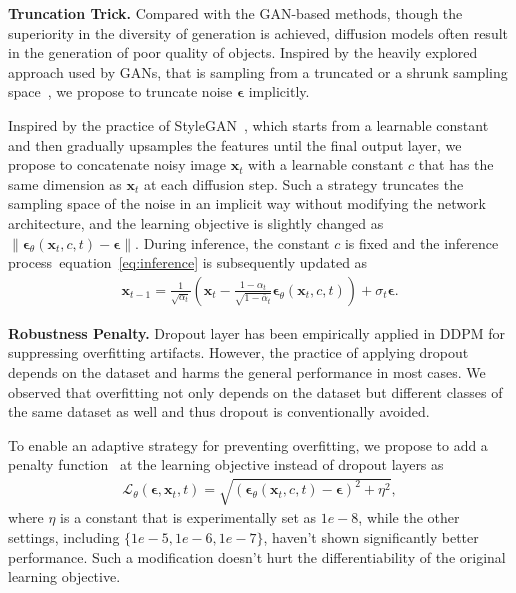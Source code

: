\documentclass[letterpaper]{article}
\def\eqref#1{equation~\ref{#1}}
\newcommand{\bx}{\mathbf{x}}
\newcommand{\bepsilon}{{\boldsymbol{\epsilon}}}
\begin{document}
\noindent \textbf{Truncation Trick.}
Compared with the GAN-based methods, though the superiority in the diversity of generation is achieved, diffusion models often result in the generation of poor quality of objects.  
Inspired by the heavily explored approach used by GANs, that is sampling from a truncated or a shrunk sampling space~\cite{brock2018large, kingma2018glow, karras2019style}, we propose to truncate noise $\bepsilon$ implicitly.

Inspired by the practice of StyleGAN~\cite{karras2019style}, which starts from a learnable constant and then gradually upsamples the features until the final output layer, we propose to concatenate noisy image $\bx_t$ with a learnable constant $c$ that has the same dimension as $\bx_t$ at each diffusion step.
Such a strategy truncates the sampling space of the noise in an implicit way without modifying the network architecture, and the learning objective is slightly changed as $\|\bepsilon_\theta(\bx_t, c, t) - \bepsilon\|$.
During inference, the constant $c$ is fixed and the inference process~\eqref{eq:inference} is subsequently updated as
\begin{align}
  \bx_{t-1} = \frac{1}{\sqrt{\alpha_t}}\left(\bx_t - \frac{1-\alpha_t}{\sqrt{1-\bar\alpha_t}}\bepsilon_\theta(\bx_t, c, t)\right) + \sigma_t\bepsilon.
\end{align}

\noindent \textbf{Robustness Penalty.}\label{sec:rob}
Dropout layer has been empirically applied in DDPM  for suppressing overfitting artifacts.
However, the practice of applying dropout depends on the dataset  and harms the general performance in most cases.
We observed that  overfitting not only depends on the dataset but different classes of the same dataset as well and thus dropout is conventionally avoided.

To enable an adaptive strategy for preventing overfitting, we propose to add a penalty function~\cite{charbonnier1994two} at the learning objective instead of dropout layers as
\begin{align}
  \label{eq:newobj}
  \mathcal{L}_\theta(\bepsilon, \bx_t, t) = \sqrt{(\bepsilon_{\theta}(\bx_t, c, t) - \bepsilon)^2 + \eta^2},
\end{align}
where $\eta$ is a constant that is experimentally set as $1e-8$, while the other settings, including $\{1e-5, 1e-6, 1e-7\}$, haven't shown significantly better performance.
Such a modification doesn't hurt the differentiability of the original learning objective.
\end{document}
